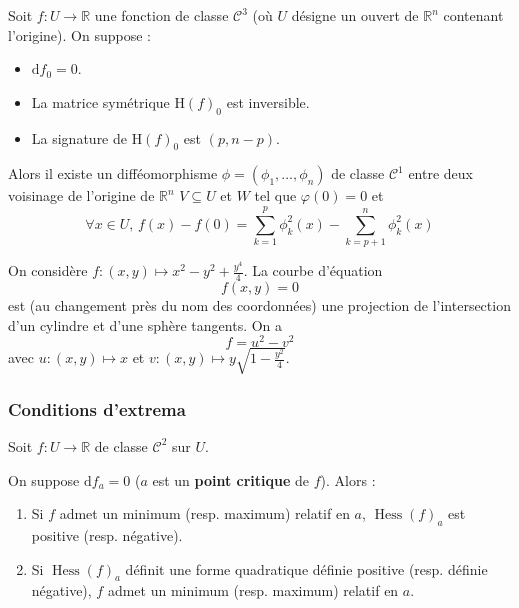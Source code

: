	\begin{lemma}[Morse]
		Soit $f : U \rightarrow \mathbb{R}$ une fonction de classe $\mathcal{C}^3$ (où $U$ désigne un ouvert de $\mathbb{R}^n$ contenant l'origine). On suppose :
		\begin{itemize}
			\item $\mathrm{d} f_0 = 0$.
			\item La matrice symétrique $\mathrm{H} (f)_0$ est inversible.
			\item La signature de $\mathrm{H}(f)_0$ est $(p, n-p)$.
		\end{itemize}
		Alors il existe un difféomorphisme $\phi = (\phi_1, \dots, \phi_n)$ de classe $\mathcal{C}^1$ entre deux voisinage de l'origine de $\mathbb{R}^n$ $V \subseteq U$ et $W$ tel que $\varphi(0) = 0$ et
		\[ \forall x \in U, \, f(x) - f(0) = \sum_{k=1}^p \phi_k^2(x) - \sum_{k=p+1}^n \phi_k^2(x) \]
	\end{lemma}


	\begin{example}
		On considère $f : (x,y) \mapsto x^2-y^2+\frac{y^4}{4}$. La courbe d'équation
		\[ f(x,y) = 0 \]
		est (au changement près du nom des coordonnées) une projection de l'intersection d'un cylindre et d'une sphère tangents. On a
		\[ f = u^2 - v^2 \]
		avec $u : (x,y) \mapsto x$ et $v : (x,y) \mapsto y \sqrt{1-\frac{y^2}{4}}$.
	\end{example}

	\subsubsection{Conditions d'extrema}

	Soit $f : U \rightarrow \mathbb{R}$ de classe $\mathcal{C}^2$ sur $U$.


	\begin{theorem}
		On suppose $\mathrm{d}f_a = 0$ ($a$ est un \textbf{point critique} de $f$). Alors :
		\begin{enumerate}[label=(\roman*)]
			\item Si $f$ admet un minimum (resp. maximum) relatif en $a$, $\operatorname{Hess}(f)_a$ est positive (resp. négative).
			\item Si $\operatorname{Hess}(f)_a$ définit une forme quadratique définie positive (resp. définie négative), $f$ admet un minimum (resp. maximum) relatif en $a$.
		\end{enumerate}
	\end{theorem}

